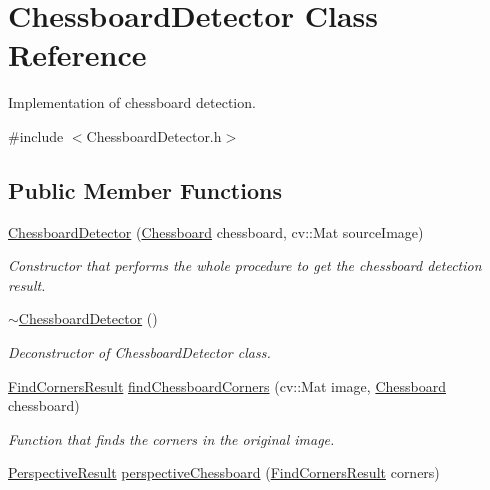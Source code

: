 \hypertarget{classChessboardDetector}{}\section{Chessboard\+Detector Class Reference}
\label{classChessboardDetector}


Implementation of chessboard detection.  




{\ttfamily \#include $<$Chessboard\+Detector.\+h$>$}

\subsection*{Public Member Functions}
\begin{DoxyCompactItemize}
\item 
\hyperlink{classChessboardDetector_aebbd98195c5f2b06ca0f10fb65d9211e}{Chessboard\+Detector} (\hyperlink{classChessboard}{Chessboard} chessboard, cv\+::\+Mat source\+Image)
\begin{DoxyCompactList}\small\item\em Constructor that performs the whole procedure to get the chessboard detection result. \end{DoxyCompactList}\item 
\mbox{\label{classChessboardDetector_a7db4aa40348c01899ac8be7a959d1f77}} 
\hyperlink{classChessboardDetector_a7db4aa40348c01899ac8be7a959d1f77}{$\sim$\+Chessboard\+Detector} ()
\begin{DoxyCompactList}\small\item\em Deconstructor of Chessboard\+Detector class. \end{DoxyCompactList}\item 
\hyperlink{structFindCornersResult}{Find\+Corners\+Result} \hyperlink{classChessboardDetector_a4d0df2c6479f32286935577e1b0fca41}{find\+Chessboard\+Corners} (cv\+::\+Mat image, \hyperlink{classChessboard}{Chessboard} chessboard)
\begin{DoxyCompactList}\small\item\em Function that finds the corners in the original image. \end{DoxyCompactList}\item 
\hyperlink{structPerspectiveResult}{Perspective\+Result} \hyperlink{classChessboardDetector_a591172112aeddde99db0f3dafda05b89}{perspective\+Chessboard} (\hyperlink{structFindCornersResult}{Find\+Corners\+Result} corners)

\end{DoxyCompactItemize}
